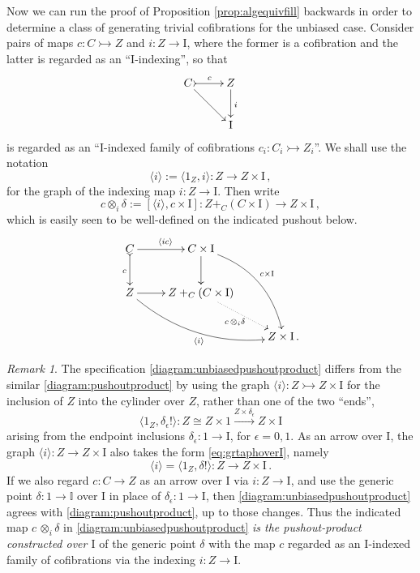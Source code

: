 \documentclass[11pt,reqno]{amsart}
\newcommand{\mono}{\ensuremath{\rightarrowtail}}
\newcommand{\ra}{\ensuremath{\rightarrow}}
\renewcommand{\to}{\ensuremath{\rightarrow}}
\newcommand{\too}{\ensuremath{\longrightarrow}}
\newcommand{\gph}[1]{\ensuremath{\langle #1 \rangle}}
\newcommand{\I}{\ensuremath{\mathrm{I}}}
\newcommand{\II}{\ensuremath{\mathbb{I}}}
\theoremstyle{remark}
\newtheorem{remark}[theorem]{Remark}
\theoremstyle{definition}
\begin{document}
Now we can run the proof of Proposition \ref{prop:algequivfill} backwards in order to determine a class of generating trivial cofibrations for the unbiased case. Consider pairs of maps $c : C\mono Z$ and $i:Z\ra\I$, where the former is a cofibration and the latter is regarded as an ``$\I$-indexing'', so that
\[
\xymatrix{
C \ar[rd] \ar@{>->}[r]^{c} & Z  \ar[d]^i \\
& \I
}
\]
is regarded as an ``$\I$-indexed family of cofibrations $c_i : C_i \mono Z_i$''.  We shall use the notation
\begin{equation}\label{eq:graphdef}
\gph{i} := \langle 1_Z, i\rangle : Z\too Z\times\I\,,
\end{equation}
for the graph of the indexing map $i : Z\ra \I$. Then write
\[
c \otimes_i\!\delta := [\gph{i}, c\times\I] : Z+_C(C\times\I) \too Z\times \I\,,
\]
which is easily seen to be well-defined on the indicated pushout below.
\begin{equation}\label{diagram:unbiasedpushoutproduct}
\xymatrix{
C \ar@{>->}[d]_{c} \ar[r]^{\gph{ic}} & C\times \I \ar[d] \ar@/^4ex/ [rdd]^{c\times\I}\\
Z \ar@/_4ex/ [rrd]_{\gph{i}} \ar[r] &  Z +_C (C\times\I) \ar@{.>}[rd]_{c\, \otimes_i \delta} \\
&& Z\times\I\,.
}
\end{equation}

\begin{remark}\label{rem:poprodoverI}
The specification \eqref{diagram:unbiasedpushoutproduct} differs from the similar \eqref{diagram:pushoutproduct} by using the graph $\gph{i} : Z\mono Z\times\I$ for the inclusion of $Z$ into the cylinder over $Z$, rather than one of the two ``ends'',
\begin{equation}\label{eq:grtaphoverI}
\gph{1_Z , \delta_\epsilon !}  : Z\cong Z\times 1 \stackrel{Z\times \delta_\epsilon}{\longrightarrow} Z\times\I
\end{equation}
arising from the endpoint inclusions $\delta_\epsilon : 1\ra\I$, for $\epsilon = 0,1$.   As an arrow over $\I$, the graph $\gph{i} : Z\to Z\times\I$ also takes the form \eqref{eq:grtaphoverI}, namely
\[
\gph{i} = \gph{1_Z , \delta !} : Z\to Z\times \I\,.
\]
If we also regard $c : C\to Z$ as an arrow over $\I$ via $i : Z\to\I$, and use the generic point $\delta : 1 \to \II$ over $\I$ in place of $\delta_\epsilon : 1 \to \I$, then  \eqref{diagram:unbiasedpushoutproduct}  agrees with  \eqref{diagram:pushoutproduct}, up to those changes.  Thus the indicated map ${c\, \otimes_i \delta}$ in  \eqref{diagram:unbiasedpushoutproduct} \emph{is the pushout-product constructed over $\I$} of the generic point $\delta$ with the map $c$ regarded as an $\I$-indexed family of cofibrations via the indexing $i : Z \to \I$.
\end{remark}
\end{document}
